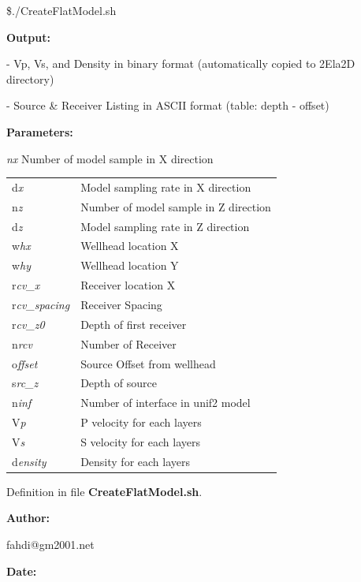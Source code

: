 \documentclass{article}
\begin{document}
\vspace{16pt}
\$./CreateFlatModel.sh 

\vspace{4pt}
\textbf{Output:}

\vspace{4pt}
- Vp, Vs, and Density in binary format (automatically copied to 2Ela2D directory)

\vspace{4pt}
- Source \& Receiver Listing in ASCII format (table: depth - offset)

\vspace{16pt}
\textbf{Parameters:}

\vspace{4pt}
\textit{nx} Number of model sample in X direction 

\vspace{4pt}
\begin{tabular}{|>{\raggedright}p{54pt}|>{\raggedright}p{245pt}|}
\hline
\tabularnewline
\hline
d\textit{x}  & Model sampling rate in X direction \tabularnewline
\hline
n\textit{z}  & Number of model sample in Z direction \tabularnewline
\hline
d\textit{z}  & Model sampling rate in Z direction \tabularnewline
\hline
w\textit{hx}  & Wellhead location X \tabularnewline
\hline
w\textit{hy}  & Wellhead location Y \tabularnewline
\hline
r\textit{cv\_x}  & Receiver location X \tabularnewline
\hline
r\textit{cv\_spacing}  & Receiver Spacing \tabularnewline
\hline
r\textit{cv\_z0}  & Depth of first receiver \tabularnewline
\hline
n\textit{rcv}  & Number of Receiver \tabularnewline
\hline
o\textit{ffset}  & Source Offset from wellhead \tabularnewline
\hline
s\textit{rc\_z}  & Depth of source \tabularnewline
\hline
n\textit{inf}  & Number of interface in unif2 model \tabularnewline
\hline
V\textit{p}  & P velocity for each layers \tabularnewline
\hline
V\textit{s}  & S velocity for each layers \tabularnewline
\hline
d\textit{ensity}  & Density for each layers \tabularnewline
\hline
\end{tabular}

\vspace{1pt}
Definition in file \textbf{CreateFlatModel.sh}.

\vspace{4pt}
\textbf{Author:}

\vspace{4pt}
\leftskip=18pt
fahdi@gm2001.net 

\vspace{4pt}
\leftskip=0pt
\textbf{Date:}
\end{document}
